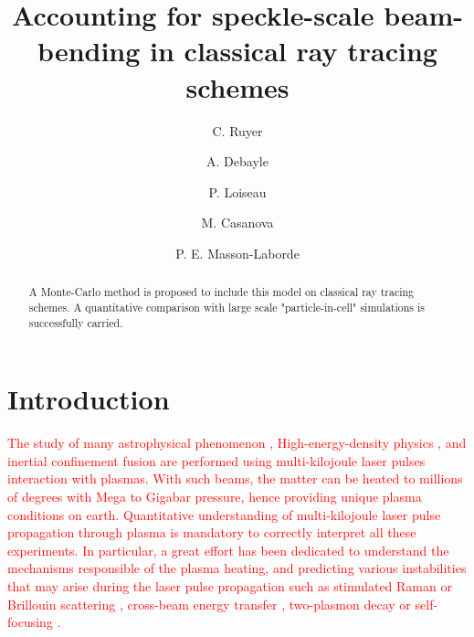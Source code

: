\documentclass[%
 reprint,
 amsmath,amssymb,
 aps,
]{revtex4-1}
\begin{document}
\title{Accounting for speckle-scale beam-bending in classical ray tracing schemes}
\author{C. Ruyer}
\author{A. Debayle}
\author{P. Loiseau}
\author{M. Casanova}
\author{P. E. Masson-Laborde}

\begin{abstract}
A Monte-Carlo method is proposed to include this model on classical ray tracing schemes. A quantitative comparison with large scale "particle-in-cell" simulations is successfully carried. 
\end{abstract}

\maketitle

\section{Introduction}
\textcolor{red}{
The study of many astrophysical phenomenon \cite{Drake_2012}, High-energy-density physics \cite{Drake2006}, and inertial confinement fusion \cite{Lindl_2004,He_2007,Cavailler_2005} are performed using multi-kilojoule laser pulses interaction with plasmas. With such beams, the matter can be heated to millions of degrees with Mega to Gigabar pressure, hence providing unique plasma conditions on earth. Quantitative understanding of 
multi-kilojoule laser pulse propagation through plasma is mandatory to correctly interpret all these experiments. In particular, a great effort has been dedicated to understand the mechanisms responsible of the plasma heating,  and  predicting various instabilities that may arise during the laser pulse propagation such as stimulated Raman or Brillouin scattering  \cite{Shen_1965,Forslund_1973,POP_Liu_2009,hao_2013}, cross-beam energy transfer \cite{hao_2016}, two-plasmon decay  \cite{Dubois_1995,Russell_2001} or self-focusing  \cite{Wagner_1968}.}
\end{document}
